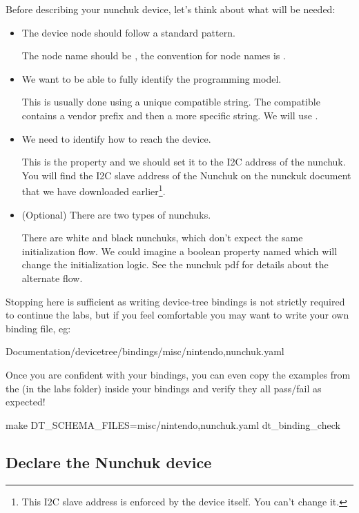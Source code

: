Before describing your nunchuk device, let's think about what will be
needed:
\begin{itemize}
\item The device node should follow a standard pattern.

  The node name should be , the convention for node
  names is .

\item We want to be able to fully identify the programming model.

  This is usually done using a unique compatible string. The compatible
  contains a vendor prefix and then a more specific string. We will use
  .

\item We need to identify how to reach the device.

  This is the  property and we should set it to the I2C
  address of the nunchuk. You will find the I2C slave address of the
  Nunchuk on the nunckuk document that we have downloaded
  earlier\footnote{This I2C slave address is enforced by the device
    itself. You can't change it.}.

\item (Optional) There are two types of nunchuks.

  There are white and black nunchuks, which don't expect the same
  initialization flow. We could imagine a boolean property named
   which will change the initialization
  logic. See the nunchuk pdf for details about the alternate flow.

\end{itemize}

Stopping here is sufficient as writing device-tree bindings is not
strictly required to continue the labs, but if you feel comfortable
you may want to write your own binding file, eg:
\begin{bashinput}
Documentation/devicetree/bindings/misc/nintendo,nunchuk.yaml
\end{bashinput}
Once you are confident with your bindings, you can even copy the
examples from the  (in the
 labs folder) inside your bindings and verify they all
pass/fail as expected!
\begin{bashinput}
make DT_SCHEMA_FILES=misc/nintendo,nunchuk.yaml dt_binding_check
\end{bashinput}

\subsection{Declare the Nunchuk device}

